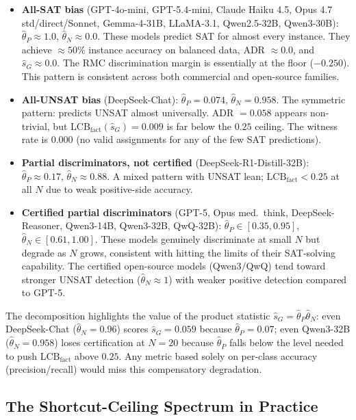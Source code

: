 \documentclass[conference]{IEEEtran}
\theoremstyle{remark}
\newcommand{\LCB}{\mathrm{LCB}}
\newcommand{\thetaP}{\hat{\theta}_P}
\newcommand{\thetaN}{\hat{\theta}_N}
\newcommand{\shat}{\hat{s}_G}
\begin{document}
\begin{itemize}[leftmargin=*, itemsep=2pt]
\item \textbf{All-SAT bias} (GPT-4o-mini, GPT-5.4-mini, Claude Haiku 4.5, Opus 4.7 std/direct/Sonnet, Gemma-4-31B, LLaMA-3.1, Qwen2.5-32B, Qwen3-30B): $\thetaP\approx 1.0$, $\thetaN\approx 0.0$.
These models predict SAT for almost every instance.
They achieve $\approx50\%$ instance accuracy on balanced data, ADR $\approx 0.0$, and $\shat\approx 0.0$.
The RMC discrimination margin is essentially at the floor ($-0.250$).
This pattern is consistent across both commercial and open-source families.

\item \textbf{All-UNSAT bias} (DeepSeek-Chat): $\thetaP=0.074$, $\thetaN=0.958$.
The symmetric pattern: predicts UNSAT almost universally.
ADR $= 0.058$ appears non-trivial, but $\LCB_{\mathrm{fact}}(\shat)=0.009$ is far below the $0.25$ ceiling.
The witness rate is $0.000$ (no valid assignments for any of the few SAT predictions).

\item \textbf{Partial discriminators, not certified} (DeepSeek-R1-Distill-32B): $\thetaP\approx0.17$, $\thetaN\approx0.88$.
A mixed pattern with UNSAT lean; $\LCB_{\mathrm{fact}}<0.25$ at all $N$ due to weak positive-side accuracy.

\item \textbf{Certified partial discriminators} (GPT-5, Opus med.\ think, DeepSeek-Reasoner, Qwen3-14B, Qwen3-32B, QwQ-32B): $\thetaP\in[0.35, 0.95]$, $\thetaN\in[0.61, 1.00]$.
These models genuinely discriminate at small $N$ but degrade as $N$ grows, consistent with hitting the limits of their SAT-solving capability.
The certified open-source models (Qwen3/QwQ) tend toward stronger UNSAT detection ($\thetaN\approx 1$) with weaker positive detection compared to GPT-5.
\end{itemize}

The decomposition highlights the value of the product statistic $\shat=\thetaP\thetaN$: even DeepSeek-Chat ($\thetaN=0.96$) scores $\shat=0.059$ because $\thetaP=0.07$; even Qwen3-32B ($\thetaN=0.958$) loses certification at $N=20$ because $\thetaP$ falls below the level needed to push $\LCB_{\mathrm{fact}}$ above $0.25$.
Any metric based solely on per-class accuracy (precision/recall) would miss this compensatory degradation.

\subsection{The Shortcut-Ceiling Spectrum in Practice}
\label{sec:spectrum}
\end{document}
